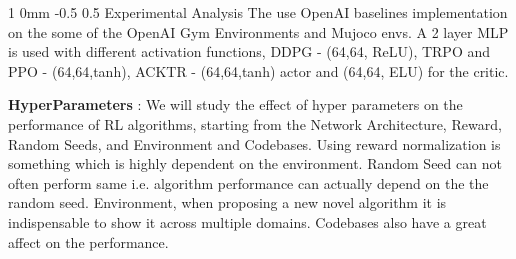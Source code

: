 \documentclass[twocolumn,11pt]{article}
\makeatletter
\renewcommand{\subsection}{\@startsection
{subsection}%
{1}%
{0mm}%
{-0.5\baselineskip}%
{0.5\baselineskip}%
{\bfseries\color{blue}}} %
\makeatother
\begin{document}
\subsection{Experimental Analysis}
The use OpenAI baselines implementation on the some of the OpenAI Gym Environments and Mujoco envs.  A 2 layer MLP is used with different activation functions, DDPG - (64,64, ReLU), TRPO and PPO - (64,64,tanh), ACKTR - (64,64,tanh) actor and (64,64, ELU) for the critic. 

\textbf{HyperParameters } : We will  study the effect of hyper parameters on the performance of RL algorithms, starting from the Network Architecture, Reward, Random Seeds, and Environment and Codebases.
Using reward normalization is something which is highly dependent on the environment. Random Seed can not often perform same i.e. algorithm performance can actually depend on the the random seed. Environment, when  proposing a new novel algorithm it is indispensable to show it across multiple domains. Codebases also have a great affect on the performance.




\end{document}
